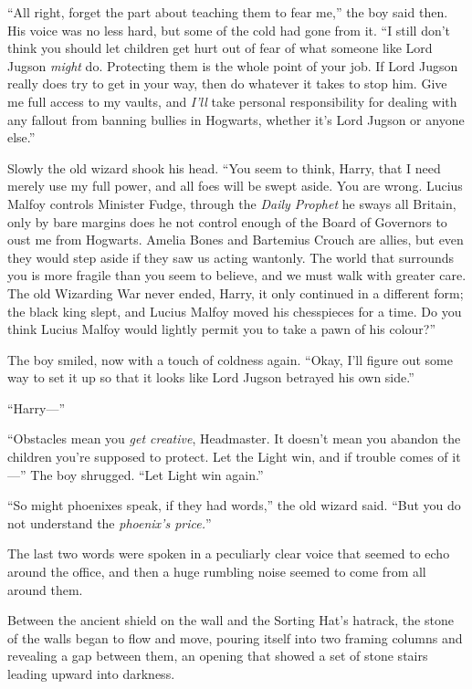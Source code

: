 ``All right, forget the part about teaching them to fear me,'' the boy
said then. His voice was no less hard, but some of the cold had gone
from it. ``I still don't think you should let children get hurt out of
fear of what someone like Lord Jugson \emph{might} do. Protecting them
is the whole point of your job. If Lord Jugson really does try to get in
your way, then do whatever it takes to stop him. Give me full access to
my vaults, and \emph{I'll} take personal responsibility for dealing with
any fallout from banning bullies in Hogwarts, whether it's Lord Jugson
or anyone else.''

Slowly the old wizard shook his head. ``You seem to think, Harry, that I
need merely use my full power, and all foes will be swept aside. You are
wrong. Lucius Malfoy controls Minister Fudge, through the \emph{Daily
Prophet} he sways all Britain, only by bare margins does he not control
enough of the Board of Governors to oust me from Hogwarts. Amelia Bones
and Bartemius Crouch are allies, but even they would step aside if they
saw us acting wantonly. The world that surrounds you is more fragile
than you seem to believe, and we must walk with greater care. The old
Wizarding War never ended, Harry, it only continued in a different form;
the black king slept, and Lucius Malfoy moved his chesspieces for a
time. Do you think Lucius Malfoy would lightly permit you to take a pawn
of his colour?''

The boy smiled, now with a touch of coldness again. ``Okay, I'll figure
out some way to set it up so that it looks like Lord Jugson betrayed his
own side.''

``Harry---''

``Obstacles mean you \emph{get creative}, Headmaster. It doesn't mean
you abandon the children you're supposed to protect. Let the Light win,
and if trouble comes of it---'' The boy shrugged. ``Let Light win
again.''

``So might phoenixes speak, if they had words,'' the old wizard said.
``But you do not understand the \emph{phoenix's price.}''

The last two words were spoken in a peculiarly clear voice that seemed
to echo around the office, and then a huge rumbling noise seemed to come
from all around them.

Between the ancient shield on the wall and the Sorting Hat's hatrack,
the stone of the walls began to flow and move, pouring itself into two
framing columns and revealing a gap between them, an opening that showed
a set of stone stairs leading upward into darkness.

